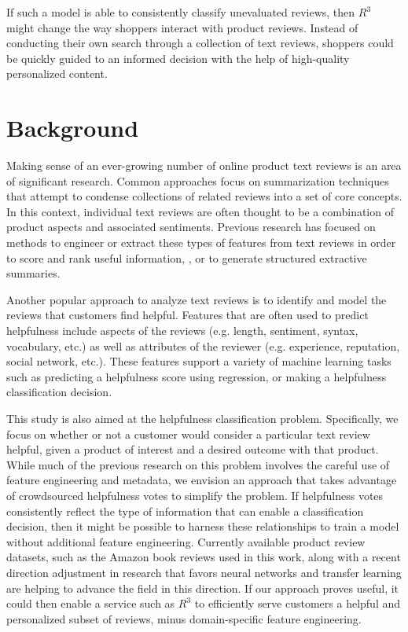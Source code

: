 \documentclass[10pt, a4paper, twocolumn]{article}
\begin{document}
If such a model is able to consistently classify unevaluated reviews, then $R^3$ might change the way shoppers interact with product reviews. Instead of conducting their own search through a collection of text reviews, shoppers could be quickly guided to an informed decision with the help of high-quality personalized content.



\section{Background}
Making sense of an ever-growing number of online product text reviews is an area of significant research. Common approaches focus on summarization techniques that attempt to condense collections of related reviews into a set of core concepts. In this context, individual text reviews are often thought to be a combination of product aspects and associated sentiments\cite{mcauley_2015}. Previous research has focused on methods to engineer or extract these types of features from text reviews in order to score and rank useful information\cite{hu_liu_2004}, \cite{bhure_pranav_2015}, or to generate structured extractive summaries\cite{kim2011comprehensive}.

Another popular approach to analyze text reviews is to identify and model the reviews that customers find helpful\cite{diaz_ng_2018}. Features that are often used to predict helpfulness include aspects of the reviews (e.g. length, sentiment, syntax, vocabulary, etc.) as well as attributes of the reviewer (e.g. experience, reputation, social network, etc.). These features support a variety of machine learning tasks such as predicting a helpfulness score using regression\cite{kim_2006}, or making a helpfulness classification decision\cite{malik_hussain_2017}.

This study is also aimed at the helpfulness classification problem. Specifically, we focus on whether or not a customer would consider a particular text review helpful, given a product of interest and a desired outcome with that product. While much of the previous research on this problem involves the careful use of feature engineering and metadata, we envision an approach that takes advantage of crowdsourced helpfulness votes to simplify the problem. If helpfulness votes consistently reflect the type of information that can enable a classification decision, then it might be possible to harness these relationships to train a model without additional feature engineering. Currently available product review datasets, such as the Amazon book reviews used in this work, along with a recent direction adjustment in research that favors neural networks and transfer learning are helping to advance the field in this direction\cite{diaz_ng_2018}. If our approach proves useful, it could then enable a service such as $R^3$ to efficiently serve customers a helpful and personalized subset of reviews, minus domain-specific feature engineering.
\end{document}
